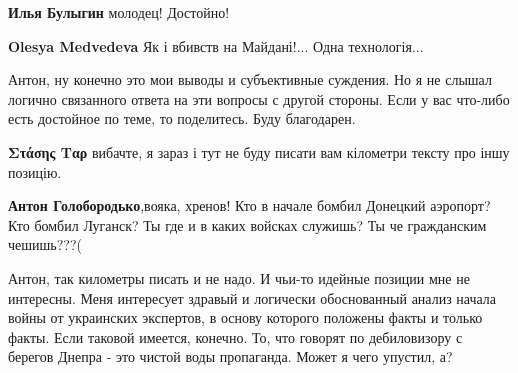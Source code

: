\begin{itemize}
\begin{itemize}
\textbf{Илья Булыгин} молодец! Достойно!

 
\textbf{Olesya Medvedeva} Як і вбивств на Майдані!... Одна технологія...

 
Антон, ну конечно это мои выводы и субъективные суждения. Но я не слышал логично связанного ответа на эти вопросы с другой стороны. Если у вас что-либо есть достойное по теме, то поделитесь. Буду благодарен.

 
\textbf{Στάσης Ταρ} вибачте, я зараз і тут не буду писати вам кілометри тексту про іншу позицію.

 
\textbf{Антон Голобородько},вояка, хренов! Кто в начале бомбил Донецкий
аэропорт? Кто бомбил Луганск? Ты где и в каких войсках служишь? Ты че гражданским
чешишь???(

 
Антон, так километры писать и не надо. И чьи-то идейные позиции мне не интересны. Меня интересует здравый и логически обоснованный анализ начала войны от украинских экспертов, в основу которого положены факты и только факты. Если таковой имеется, конечно. То, что говорят по дебиловизору с берегов Днепра - это чистой воды пропаганда. Может я чего упустил, а?


\end{itemize}
\end{itemize}
